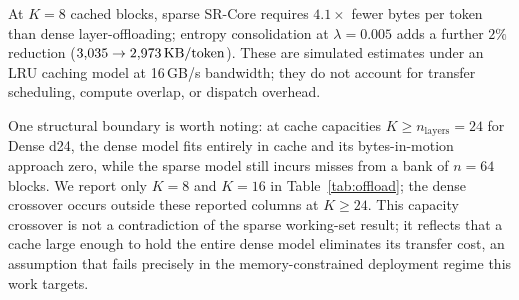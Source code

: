 At $K = 8$ cached blocks, sparse SR-Core requires $4.1\times$ fewer bytes per token than
dense layer-offloading; entropy consolidation at $\lambda = 0.005$ adds a further $2\%$
reduction ($3{,}035 \to 2{,}973\,\text{KB/token}$).
These are simulated estimates under an LRU caching model at 16\,GB/s bandwidth; they do not
account for transfer scheduling, compute overlap, or dispatch overhead.

One structural boundary is worth noting: at cache capacities
$K \geq n_{\mathrm{layers}} = 24$ for Dense d24, the dense model fits entirely in cache
and its bytes-in-motion approach zero, while the sparse model still incurs misses from a
bank of $n = 64$ blocks.
We report only $K = 8$ and $K = 16$ in Table~\ref{tab:offload}; the dense crossover occurs
outside these reported columns at $K \geq 24$.
This capacity crossover is not a contradiction of the sparse working-set result; it reflects
that a cache large enough to hold the entire dense model eliminates its transfer cost, an
assumption that fails precisely in the memory-constrained deployment regime this work
targets.



